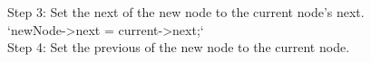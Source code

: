\documentclass[preview]{standalone}
\begin{document}
Step 3: Set the next of the new node to the current node's next.\\`newNode->next = current->next;`\\Step 4: Set the previous of the new node to the current node.\\
\end{document}
